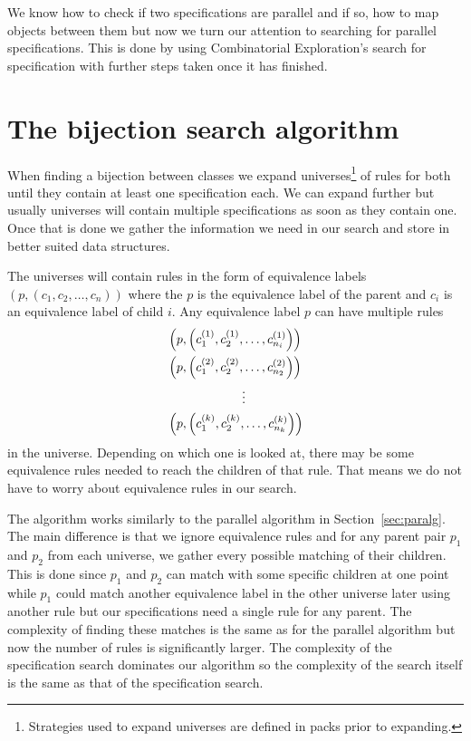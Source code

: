 \label{ch:search}
We know how to check if two specifications are parallel and if so, how to map objects between them but now we turn our attention to searching for parallel specifications. This is done by using Combinatorial Exploration's search for specification with further steps taken once it has finished.

\section{The bijection search algorithm}
When finding a bijection between classes we expand universes\footnote{Strategies used to expand universes are defined in packs prior to expanding.} of rules for both until they contain at least one specification each. We can expand further but usually universes will contain multiple specifications as soon as they contain one. Once that is done we gather the information we need in our search and store in better suited data structures.

The universes will contain rules in the form of equivalence labels $(p, (c_1,c_2,\dotsc,c_n))$ where the $p$ is the equivalence label of the parent and $c_i$ is an equivalence label of child $i$. Any equivalence label $p$ can have multiple rules
\begin{align*}
    &\left(p, \left(c^{(1)}_1, c^{(1)}_2, \dotsc, c^{(1)}_{n_i}\right)\right)\\
    &\left(p, \left(c^{(2)}_1, c^{(2)}_2, \dotsc, c^{(2)}_{n_2}\right)\right)\\
    &\hspace{2.1cm}\vdots\\
    &\left(p, \left(c^{(k)}_1, c^{(k)}_2, \dotsc, c^{(k)}_{n_k}\right)\right)
\end{align*}
in the universe. Depending on which one is looked at, there may be some equivalence rules needed to reach the children of that rule. That means we do not have to worry about equivalence rules in our search.

The algorithm works similarly to the parallel algorithm in Section~\ref{sec:paralg}. The main difference is that we ignore equivalence rules and for any parent pair $p_1$ and $p_2$ from each universe, we gather every possible matching of their children. This is done since $p_1$ and $p_2$ can match with some specific children at one point while $p_1$ could match another equivalence label in the other universe later using another rule but our specifications need a single rule for any parent. The complexity of finding these matches is the same as for the parallel algorithm but now the number of rules is significantly larger. The complexity of the specification search dominates our algorithm so the complexity of the search itself is the same as that of the specification search.

